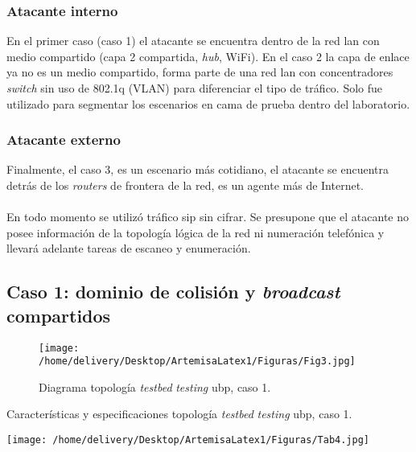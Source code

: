 \documentclass[a4paper,12pt]{report}
\begin{document}
\subsubsection{Atacante interno}
En el primer caso (caso 1) el atacante se encuentra dentro de la red \ac{lan} con
medio compartido (capa 2 compartida, \emph{hub}, WiFi). En el caso 2 la capa de enlace
ya no es un medio compartido, forma parte de una red \ac{lan} con concentradores
\emph{switch} sin uso de 802.1q (VLAN) para diferenciar el tipo de tráfico. Solo fue
utilizado para segmentar los escenarios en cama de prueba dentro del laboratorio. 

\subsubsection{Atacante externo}
Finalmente, el caso 3, es un escenario más cotidiano, el atacante se encuentra 
detrás de los \emph{routers} de frontera de la red, es un agente más de Internet. \\\\

En todo momento se utilizó tráfico \ac{sip} sin cifrar.
Se presupone que el atacante no posee información de la topología lógica de la 
red ni numeración telefónica y llevará adelante tareas de escaneo y
enumeración.

\subsection{Caso 1: dominio de colisión y \emph{broadcast} compartidos}
\label{caso1}

\begin{figure}[h!] 
\centering
\texttt{[image: /home/delivery/Desktop/ArtemisaLatex1/Figuras/Fig3.jpg]}
\caption{Diagrama topología \emph{testbed} \emph{testing} \ac{ubp}, caso 1.}
\label{caso1_topología}
\end{figure}

\begin{table}[h!]
\caption{Características y especificaciones topología \emph{testbed} \emph{testing} \ac{ubp}, caso 1.}
\centering
\texttt{[image: /home/delivery/Desktop/ArtemisaLatex1/Figuras/Tab4.jpg]}
\label{caso1_topología_tabla}
\end{table}
\end{document}
